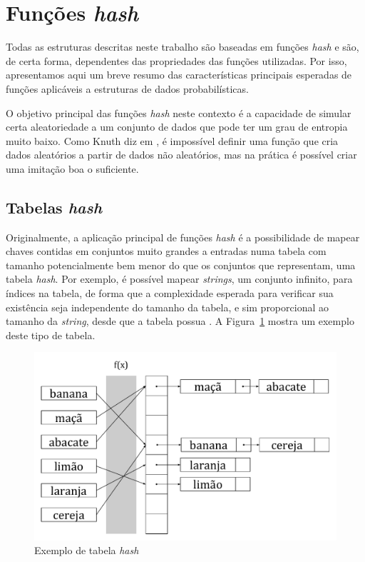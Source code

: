 \section{Funções \emph{hash}}

Todas as estruturas descritas neste trabalho são baseadas em funções \emph{hash} e são, de certa forma, dependentes das propriedades das funções utilizadas. Por isso, apresentamos aqui um breve resumo das características principais esperadas de funções aplicáveis a estruturas de dados probabilísticas.

O objetivo principal das funções \emph{hash} neste contexto é a capacidade de simular certa aleatoriedade a um conjunto de dados que pode ter um grau de entropia muito baixo. Como Knuth diz em \cite{knuth1998art}, é impossível definir uma função que cria dados aleatórios a partir de dados não aleatórios, mas na prática é possível criar uma imitação boa o suficiente.

\subsection{Tabelas \emph{hash}}

Originalmente, a aplicação principal de funções \emph{hash} é a possibilidade de mapear chaves contidas em conjuntos muito grandes a entradas numa tabela com tamanho potencialmente bem menor do que os conjuntos que representam, uma tabela \emph{hash}. Por exemplo, é possível mapear \emph{strings}, um conjunto infinito, para índices na tabela, de forma que a complexidade esperada para verificar sua existência seja independente do tamanho da tabela, e sim proporcional ao tamanho da \emph{string}, desde que a tabela possua . A Figura~\ref{fig:hashtable} mostra um exemplo deste tipo de tabela.

\begin{figure}[!htbp]
  \centering
  \includegraphics[scale=0.5]{files/hashtable.pdf}
  \caption{Exemplo de tabela \emph{hash}}
  \label{fig:hashtable}
\end{figure}

